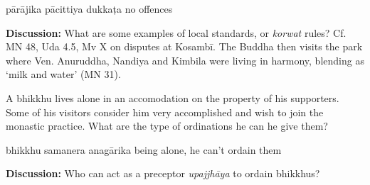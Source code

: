 \begin{exam}{\autoExamName}
\begin{problem}
  \bigskip

  \begin{answers}{4}
    \bChoices
     pārājika\eAns
     pācittiya\eAns
     dukkaṭa\eAns
     no offences\eAns
    \eChoices
  \end{answers}

\end{problem}

\bigskip

\textbf{Discussion:} What are some examples of local standards, or \emph{korwat}
rules? Cf. MN 48, Uda 4.5, Mv X on disputes at Kosambī. The Buddha then visits
the park where Ven. Anuruddha, Nandiya and Kimbila were living in harmony,
blending as `milk and water' (MN 31).

\problemDivide

\begin{problem}

  A bhikkhu lives alone in an accomodation on the property of his supporters. Some of
  his visitors consider him very accomplished and wish to join the monastic practice.
  What are the type of ordinations he can he give them?

  \bigskip

  \begin{manswers}{4}
    \bChoices
     bhikkhu\eAns
     samanera\eAns
     anagārika\eAns
     being alone, he can't ordain them\eAns
    \eChoices
  \end{manswers}

\end{problem}

\bigskip

\textbf{Discussion:} Who can act as a preceptor \emph{upajjhāya} to ordain bhikkhus?

\end{exam}

